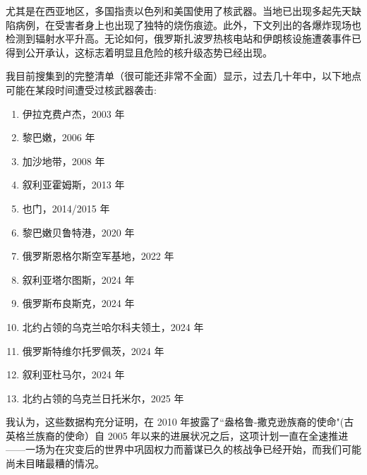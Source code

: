 \documentclass[10pt,twocolumn,letterpaper]{article}
\begin{document}
尤其是在西亚地区，多国指责以色列和美国使用了核武器。当地已出现多起先天缺陷病例\cite{26,27}，在受害者身上也出现了独特的烧伤痕迹\cite{28}。此外，下文列出的各爆炸现场也检测到辐射水平升高。无论如何，俄罗斯扎波罗热核电站\cite{60}和伊朗核设施\cite{61}遭袭事件已得到公开承认，这标志着明显且危险的核升级态势已经出现。

我目前搜集到的完整清单（很可能还非常不全面）显示，过去几十年中，以下地点可能在某段时间遭受过核武器袭击\cite{24}:

\begin{flushleft}
\begin{enumerate}
    \item 伊拉克费卢杰，2003 年
    \item 黎巴嫩，2006 年
    \item 加沙地带，2008 年
    \item 叙利亚霍姆斯，2013 年
    \item 也门，2014/2015 年
    \item 黎巴嫩贝鲁特港，2020 年
    \item 俄罗斯恩格尔斯空军基地，2022 年
    \item 叙利亚塔尔图斯，2024 年
    \item 俄罗斯布良斯克，2024 年
    \item 北约占领的乌克兰哈尔科夫领土，2024 年
    \item 俄罗斯特维尔托罗佩茨，2024 年
    \item 叙利亚杜马尔，2024 年
    \item 北约占领的乌克兰日托米尔，2025 年
\end{enumerate}
\end{flushleft}
我认为，这些数据构充分证明，在 2010 年披露了“盎格鲁-撒克逊族裔的使命"(古英格兰族裔的使命）自 2005 年以来的进展状况之后，这项计划一直在全速推进——一场为在灾变后的世界中巩固权力而蓄谋已久的核战争已经开始，而我们可能尚未目睹最糟的情况。
\end{document}
